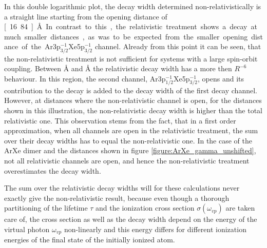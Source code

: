 In this double logarithmic plot, the decay width determined non-relativistically
is a straight line starting
from the opening distance of \unit[16.84]{\AA}.
In contrast to this, the relativistic treatment shows a decay at much smaller
distances, as was to be expected from the smaller opening distance of the
Ar3p$_{3/2}^{-1}$Xe5p$_{3/2}^{-1}$ channel. Already from this point it
can be seen, that the non-relativistic treatment is not sufficient for systems
with a large spin-orbit coupling. Between \unit[12]{\AA} and
\unit[13]{\AA} the relativistic decay width has a more then $R^{-6}$ behaviour.
In this region, the second channel, Ar3p$_{1/2}^{-1}$Xe5p$_{3/2}^{-1}$, opens
and its contribution to the decay is added to the decay width of the first
decay channel. However, at distances where the non-relativistic channel is open,
for the distances shown in this illustration, the non-relativistic decay width
is higher than the total relativistic one. This observation stems from the fact,
that in a first order approximation, when all channels are open in the relativistic
treatment, the sum over their decay widths has to equal the non-relativistic one.
In the case of the ArXe dimer and the distances shown in figure
\ref{figure:ArXe_gamma_unshifted}, not all relativistic channels are open, and
hence the non-relativistic treatment overestimates the decay width.

The sum over the relativistic decay widths will for these calculations never
exactly give the non-relativistic result, because even though a thorough
partitioning of the lifetime $\tau$ and the ionization cross section
$\sigma(\omega_{vp})$ are taken care of, the cross section as well as the decay
width depend on the energy of the virtual photon $\omega_{vp}$ non-linearly and this
energy differs for different ionization energies of the final state of the
initially ionized atom.
